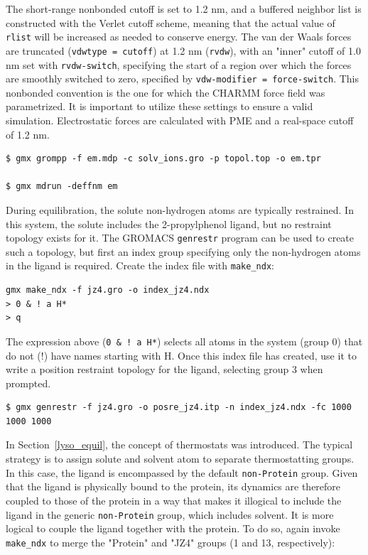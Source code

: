 \documentclass[9pt,tutorial,pubversion]{livecoms}
\begin{document}
The short-range nonbonded cutoff is set to 1.2 nm, and a buffered neighbor list is constructed with the Verlet cutoff scheme, meaning that the actual value of \texttt{rlist} will be increased as needed to conserve energy. The van der Waals forces are truncated (\texttt{vdwtype = cutoff}) at 1.2 nm (\texttt{rvdw}), with an "inner" cutoff of 1.0 nm set with \texttt{rvdw-switch}, specifying the start of a region over which the forces are smoothly switched to zero, specified by \texttt{vdw-modifier = force-switch}. This nonbonded convention is the one for which the CHARMM force field was parametrized. It is important to utilize these settings to ensure a valid simulation. Electrostatic forces are calculated with PME and a real-space cutoff of 1.2 nm.

\begin{lstlisting}
$ gmx grompp -f em.mdp -c solv_ions.gro -p topol.top -o em.tpr

$ gmx mdrun -deffnm em
\end{lstlisting}

During equilibration, the solute non-hydrogen atoms are typically restrained. In this system, the solute includes the 2-propylphenol ligand, but no restraint topology exists for it. The GROMACS \texttt{genrestr} program can be used to create such a topology, but first an index group specifying only the non-hydrogen atoms in the ligand is required. Create the index file with \texttt{make\_ndx}:

\begin{lstlisting}
gmx make_ndx -f jz4.gro -o index_jz4.ndx
> 0 & ! a H*
> q
\end{lstlisting}
%
The expression above (\texttt{0 \& ! a H*}) selects all atoms in the system (group 0) that do not (!) have names starting with H. Once this index file has created, use it to write a position restraint topology for the ligand, selecting group 3 when prompted.

\begin{lstlisting}
$ gmx genrestr -f jz4.gro -o posre_jz4.itp -n index_jz4.ndx -fc 1000 1000 1000
\end{lstlisting}

In Section~\ref{lyso_equil}, the concept of thermostats was introduced. The typical strategy is to assign solute and solvent atom to separate thermostatting groups. In this case, the ligand is encompassed by the default \texttt{non-Protein} group. Given that the ligand is physically bound to the protein, its dynamics are therefore coupled to those of the protein in a way that makes it illogical to include the ligand in the generic \texttt{non-Protein} group, which includes solvent. It is more logical to couple the ligand together with the protein. To do so, again invoke \texttt{make\_ndx} to merge the "Protein" and "JZ4" groups (1 and 13, respectively):
\end{document}

